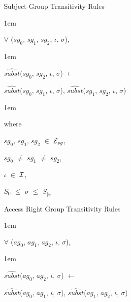 \documentclass[11pt]{report}
\newenvironment{vquote}
{
  \begin{list}{}{\leftmargin 1em}\item[]
}
{
  \end{list}
}
\begin{document}
            \begin{enumerate}
              \item
                Subject Group Transitivity Rules

                \begin{vquote}
                  $\forall$ ($sg_{0}$, $sg_{1}$, $sg_{2}$, $\iota$, $\sigma$),
                \end{vquote}

                \begin{vquote}
                  $\hat{subst}$($sg_{0}$, $sg_{2}$, $\iota$, $\sigma$)
                  $\leftarrow$

                  \hspace{1em}
                  $\hat{subst}$($sg_{0}$, $sg_{1}$, $\iota$, $\sigma$),
                  $\hat{subst}$($sg_{1}$, $sg_{2}$, $\iota$, $\sigma$)
                \end{vquote}

                \begin{vquote}
                  where

                  \hspace{1em}
                  $sg_{0}$, $sg_{1}$, $sg_{2}$ $\in$ ${\cal E}_{sg}$,

                  \hspace{1em}
                  $sg_{0}$ $\neq$ $sg_{1}$ $\neq$ $sg_{2}$,

                  \hspace{1em}
                  $\iota$ $\in$ ${\cal I}$,

                  \hspace{1em}
                  $S_{0}$ $\leq$ $\sigma$ $\leq$ $S_{|\psi|}$
                \end{vquote}

              \item
                Access Right Group Transitivity Rules

                \begin{vquote}
                  $\forall$ ($ag_{0}$, $ag_{1}$, $ag_{2}$, $\iota$, $\sigma$),
                \end{vquote}

                \begin{vquote}
                  $\hat{subst}$($ag_{0}$, $ag_{2}$, $\iota$, $\sigma$)
                  $\leftarrow$

                  \hspace{1em}
                  $\hat{subst}$($ag_{0}$, $ag_{1}$, $\iota$, $\sigma$),
                  $\hat{subst}$($ag_{1}$, $ag_{2}$, $\iota$, $\sigma$)
                \end{vquote}


\end{enumerate}
\end{document}
